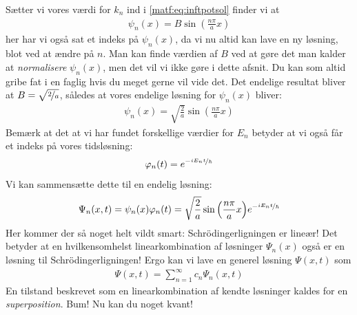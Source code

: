 \documentclass[crop=false, class=memoir]{standalone}
\begin{document}
Sætter vi vores værdi for $k_n$ ind i \cref{matf:eq:inftpotsol} finder vi at
\begin{align}
    \psi_n (x) = B\sin{ \left(\frac{n\pi}{a} x\right)}
\end{align}
her har vi også sat et indeks på $\psi_n (x)$, da vi nu altid kan lave en ny løsning, blot ved at ændre på $n$. Man kan finde værdien af $B$ ved at gøre det man kalder at \emph{normalisere} $\psi_n (x)$, men det vil vi ikke gøre i dette afsnit. Du kan som altid gribe fat i en faglig hvis du meget gerne vil vide det. Det endelige resultat bliver at $B = \sqrt{\nicefrac{2}{a}}$, således at vores endelige løsning for $\psi_n(x)$ bliver:
\begin{align}
    \psi_n(x) = \sqrt{\frac{2}{a}} \sin{\left(\frac{n\pi}{a} x\right)}
\end{align}
Bemærk at det at vi har fundet forskellige værdier for $E_n$ betyder at vi også får et indeks på vores tidsløsning:
\begin{align}
    \phi_n (t) = e^{-\nicefrac{iE_n t}{\hbar}}
\end{align}
Vi kan sammensætte dette til en endelig løsning:
\begin{align}
    \Psi_n(x,t) = \psi_n (x) \phi_n(t) = \sqrt{\frac{2}{a}}\sin{\left(\frac{n\pi}{a} x\right)}e^{-\nicefrac{iE_n t}{\hbar}}
\end{align}
Her kommer der så noget helt vildt smart: Schrödingerligningen er lineær! Det betyder at en hvilkensomhelst linearkombination af løsninger $\Psi_n (x)$ også er en løsning til Schrödingerligningen! Ergo kan vi lave en generel løsning $\Psi(x,t)$ som
\begin{align}
    \Psi(x,t) = \sum_{n=1}^{\infty} c_n \Psi_n (x,t)
\end{align}
En tilstand beskrevet som en linearkombination af kendte løsninger kaldes for en \emph{superposition}.
Bum! Nu kan du noget kvant!

\cite{RileyHobson2011}
\cite{Lindstroem2016}
\nocite{griffithsIntroductionQuantumMechanics2005}
\end{document}
